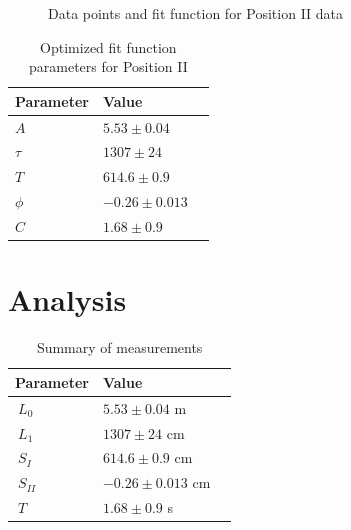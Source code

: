 \documentclass[twoside,twocolumn]{article}
\begin{document}
\begin{figure}[H]
\centering
  \begin{center}
  \end{center}
  \caption{Data points and fit function for Position II data}
\end{figure}
\label{fig:pos2_plot}

\begin{table}[H]
\caption{Optimized fit function parameters for Position II}
\centering
\begin{tabular}{llr}
\toprule
\cmidrule(r){1-2}
Parameter & Value \\
\midrule
$ A$ & $ 5.53 \pm 0.04 $ \\
$ \tau$ & $ 1307 \pm 24 $ \\
$ T$ & $ 614.6 \pm 0.9 $ \\
$ \phi$ & $ -0.26 \pm 0.013 $ \\
$ C$ & $ 1.68 \pm 0.9 $ \\
\bottomrule
\end{tabular}
\end{table}

\section{Analysis}

\begin{table}[H]
\caption{Summary of measurements}
\centering
\begin{tabular}{llr}
\toprule
\cmidrule(r){1-2}
Parameter & Value \\
\midrule
$\ L_{0}$ & $ 5.53 \pm 0.04 $ m \\
$\ L_{1}$ & $ 1307 \pm 24 $ cm \\
$\ S_{I}$ & $ 614.6 \pm 0.9 $ cm \\
$\ S_{II}$ & $ -0.26 \pm 0.013 $ cm \\
$\ T$ & $ 1.68 \pm 0.9 $ s \\
\bottomrule
\end{tabular}
\end{table}
\end{document}
